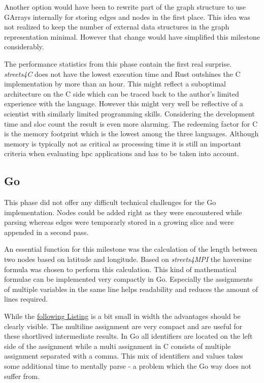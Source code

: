 Another option would have been to rewrite part of the graph structure to use GArrays internally for storing edges and nodes in the first place. This idea was not realized to keep the number of external data structures in the graph representation minimal. However that change would have simplified this milestone considerably.

The performance statistics from this phase contain the first real surprise. \textit{streets4C} does not have the lowest execution time and Rust outshines the C implementation by more than an hour. This might reflect a suboptimal architecture on the C side which can be traced back to the author's limited experience with the language. However this might very well be reflective of a scientist with similarly limited programming skills. Considering the development time and \gls{sloc} count the result is even more alarming. The redeeming factor for C is the memory footprint which is the lowest among the three languages. Although memory is typically not as critical as processing time it is still an important criteria when evaluating \gls{hpc} applications and has to be taken into account.

\subsection{Go}
\label{subsec:Implementation::SequentialBenchmark::Go}

This phase did not offer any difficult technical challenges for the Go implementation. Nodes could be added right as they were encountered while parsing whereas edges were temporarly stored in a growing slice and were appended in a second pass.

An essential function for this milestone was the calculation of the length between two nodes based on latitude and longitude. Based on \textit{streets4MPI} the haversine formula was chosen to perform this calculation. This kind of mathematical formulae can be implemented very compactly in Go. Especially the assignments of multiple variables in the same line helps readability and reduces the amount of lines required.

While the \hyperref[lst:haversine.go]{following Listing} is a bit small in width the advantages should be clearly visible. The multiline assignment are very compact and are useful for these shortlived intermediate results. In Go all identifiers are located on the left side of the assignment while a multi assignment in C consists of multiple assignment separated with a comma. This mix of identifiers and values takes some additional time to mentally parse - a problem which the Go way does not suffer from.
\\


